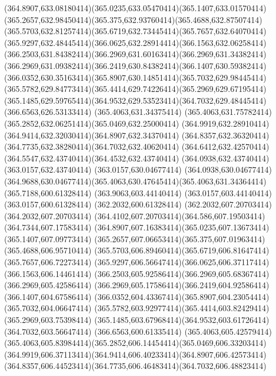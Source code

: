{{	\curveto(364.8907,633.08180414)(365.0235,633.05470414)(365.1407,633.01570414)
	\curveto(365.2657,632.98450414)(365.375,632.93760414)(365.4688,632.87507414)
	\curveto(365.5703,632.81257414)(365.6719,632.73445414)(365.7657,632.64070414)
	\curveto(365.9297,632.48445414)(366.0625,632.28914414)(366.1563,632.06258414)
	\curveto(366.2503,631.84382414)(366.2969,631.60163414)(366.2969,631.34382414)
	\curveto(366.2969,631.09382414)(366.2419,630.84382414)(366.1407,630.59382414)
	\curveto(366.0352,630.35163414)(365.8907,630.14851414)(365.7032,629.98445414)
	\curveto(365.5782,629.84773414)(365.4414,629.74226414)(365.2969,629.67195414)
	\curveto(365.1485,629.59765414)(364.9532,629.53523414)(364.7032,629.48445414)
	\lineto(366.6563,626.53133414)
	\closepath
	\moveto(365.4063,631.34375414)
	\curveto(365.4063,631.75782414)(365.2852,632.06251414)(365.0469,632.25000414)
	\curveto(364.9919,632.28910414)(364.9414,632.32030414)(364.8907,632.34370414)
	\curveto(364.8357,632.36320414)(364.7735,632.38280414)(364.7032,632.40620414)
	\curveto(364.6412,632.42570414)(364.5547,632.43740414)(364.4532,632.43740414)
	\lineto(364.0938,632.43740414)
	\lineto(363.0157,632.43740414)
	\lineto(363.0157,630.04677414)
	\lineto(364.0938,630.04677414)
	\curveto(364.9688,630.04677414)(365.4063,630.47645414)(365.4063,631.34364414)
	\closepath
	\moveto(365.7188,600.61328414)
	\lineto(363.9063,603.44140414)
	\lineto(363.0157,603.44140414)
	\lineto(363.0157,600.61328414)
	\lineto(362.2032,600.61328414)
	\lineto(362.2032,607.20703414)
	\lineto(364.2032,607.20703414)
	\curveto(364.4102,607.20703414)(364.586,607.19503414)(364.7344,607.17583414)
	\curveto(364.8907,607.16383414)(365.0235,607.13673414)(365.1407,607.09773414)
	\curveto(365.2657,607.06653414)(365.375,607.01963414)(365.4688,606.95710414)
	\curveto(365.5703,606.89460414)(365.6719,606.81647414)(365.7657,606.72273414)
	\curveto(365.9297,606.56647414)(366.0625,606.37117414)(366.1563,606.14461414)
	\curveto(366.2503,605.92586414)(366.2969,605.68367414)(366.2969,605.42586414)
	\curveto(366.2969,605.17586414)(366.2419,604.92586414)(366.1407,604.67586414)
	\curveto(366.0352,604.43367414)(365.8907,604.23054414)(365.7032,604.06647414)
	\curveto(365.5782,603.92977414)(365.4414,603.82429414)(365.2969,603.75398414)
	\curveto(365.1485,603.67968414)(364.9532,603.61726414)(364.7032,603.56647414)
	\lineto(366.6563,600.61335414)
	\closepath
	\moveto(365.4063,605.42579414)
	\curveto(365.4063,605.83984414)(365.2852,606.14454414)(365.0469,606.33203414)
	\curveto(364.9919,606.37113414)(364.9414,606.40233414)(364.8907,606.42573414)
	\curveto(364.8357,606.44523414)(364.7735,606.46483414)(364.7032,606.48823414)
}}
